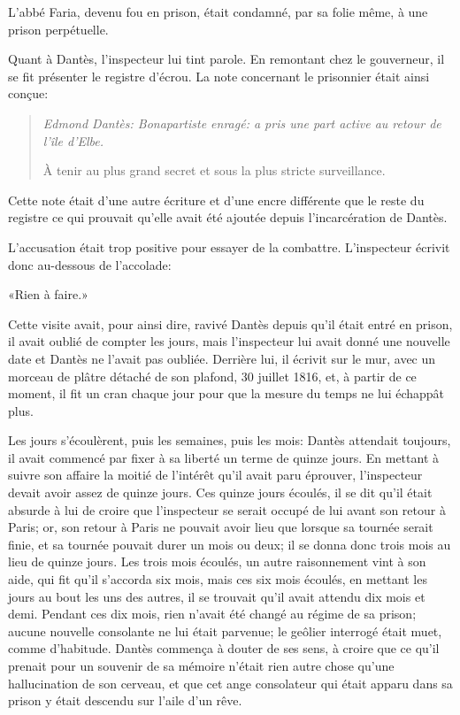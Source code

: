 L'abbé Faria, devenu fou en prison, était condamné, par sa folie même, à une prison perpétuelle.

Quant à Dantès, l'inspecteur lui tint parole. En remontant chez le gouverneur, il se fit présenter le registre d'écrou. La note concernant le prisonnier était ainsi conçue:

\begin{quote}\itshape
	Edmond Dantès: Bonapartiste enragé: a pris une part active au retour de l'île d'Elbe.

À tenir au plus grand secret et sous la plus stricte surveillance.
	\end{quote}

Cette note était d'une autre écriture et d'une encre différente que le reste du registre ce qui prouvait qu'elle avait été ajoutée depuis l'incarcération de Dantès.

L'accusation était trop positive pour essayer de la combattre. L'inspecteur écrivit donc au-dessous de l'accolade:

«Rien à faire.»

Cette visite avait, pour ainsi dire, ravivé Dantès depuis qu'il était entré en prison, il avait oublié de compter les jours, mais l'inspecteur lui avait donné une nouvelle date et Dantès ne l'avait pas oubliée. Derrière lui, il écrivit sur le mur, avec un morceau de plâtre détaché de son plafond, 30 juillet 1816, et, à partir de ce moment, il fit un cran chaque jour pour que la mesure du temps ne lui échappât plus.

Les jours s'écoulèrent, puis les semaines, puis les mois: Dantès attendait toujours, il avait commencé par fixer à sa liberté un terme de quinze jours. En mettant à suivre son affaire la moitié de l'intérêt qu'il avait paru éprouver, l'inspecteur devait avoir assez de quinze jours. Ces quinze jours écoulés, il se dit qu'il était absurde à lui de croire que l'inspecteur se serait occupé de lui avant son retour à Paris; or, son retour à Paris ne pouvait avoir lieu que lorsque sa tournée serait finie, et sa tournée pouvait durer un mois ou deux; il se donna donc trois mois au lieu de quinze jours. Les trois mois écoulés, un autre raisonnement vint à son aide, qui fit qu'il s'accorda six mois, mais ces six mois écoulés, en mettant les jours au bout les uns des autres, il se trouvait qu'il avait attendu dix mois et demi. Pendant ces dix mois, rien n'avait été changé au régime de sa prison; aucune nouvelle consolante ne lui était parvenue; le geôlier interrogé était muet, comme d'habitude. Dantès commença à douter de ses sens, à croire que ce qu'il prenait pour un souvenir de sa mémoire n'était rien autre chose qu'une hallucination de son cerveau, et que cet ange consolateur qui était apparu dans sa prison y était descendu sur l'aile d'un rêve.

